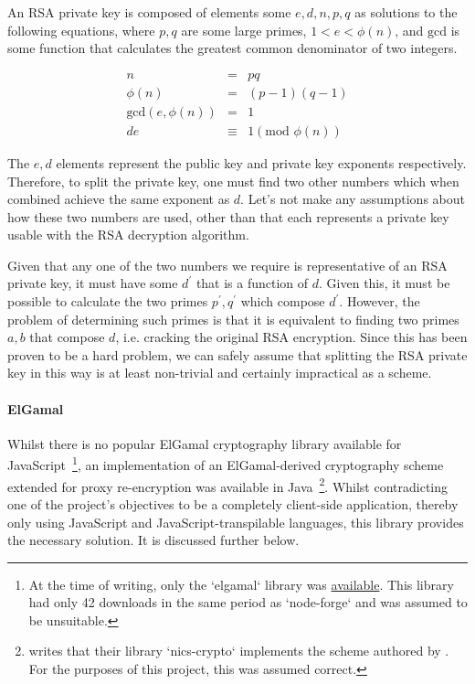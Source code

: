 An RSA private key is composed of elements some $e, d, n, p, q$ as solutions to the following equations, where $p, q$ are some large primes, $1 < e < \phi(n)$, and $\text{gcd}$ is some function that calculates the greatest common denominator of two integers.

$$
\begin{aligned}
  n &=& pq \\
  \phi(n) &=& (p - 1)(q - 1) \\
  \text{gcd}(e, \phi(n)) &=& 1 \\
  de & \equiv & 1 (\text{mod } \phi(n))
\end{aligned}
$$

The $e, d$ elements represent the public key and private key exponents respectively. Therefore, to split the private key, one must find two other numbers which when combined achieve the same exponent as $d$. Let's not make any assumptions about how these two numbers are used, other than that each represents a private key usable with the RSA decryption algorithm.

Given that any one of the two numbers we require is representative of an RSA private key, it must have some $d^\prime$ that is a function of $d$. Given this, it must be possible to calculate the two primes $p^\prime, q^\prime$ which compose $d^\prime$. However, the problem of determining such primes is that it is equivalent to finding two primes $a, b$ that compose $d$, i.e. cracking the original RSA encryption. Since this has been proven to be a hard problem, we can safely assume that splitting the RSA private key in this way is at least non-trivial and certainly impractical as a scheme. 


\paragraph{ElGamal}

Whilst there is no popular ElGamal cryptography library available for JavaScript~\footnote{At the time of writing, only the `elgamal` library was \href{https://www.npmjs.com/package/elgamal}{available}. This library had only 42 downloads in the same period as `node-forge` and was assumed to be unsuitable.}, an implementation of an ElGamal-derived cryptography scheme extended for proxy re-encryption was available in Java~\footnote{\cite{nicscrypto:2012:online} writes that their library `nics-crypto` implements the scheme authored by \cite{afgh:2006:article}. For the purposes of this project, this was assumed correct.}. Whilst contradicting one of the project's objectives to be a completely client-side application, thereby only using JavaScript and JavaScript-transpilable languages, this library provides the necessary solution. It is discussed further below.
